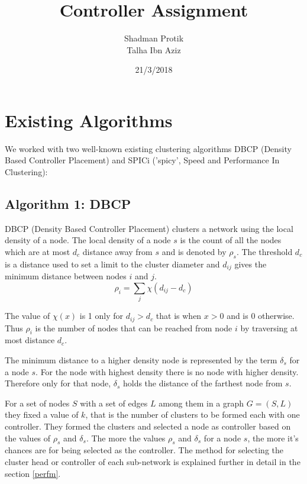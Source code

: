 \documentclass[8pt]{extarticle}
\begin{document}
	
	\twocolumn
	
	\title{Controller Assignment}
	\author{Shadman Protik\\Talha Ibn Aziz }
	\date{21/3/2018}
	\maketitle
	
	\section{Existing Algorithms}
	
	We worked with two well-known existing clustering algorithms DBCP (Density Based Controller Placement) and SPICi ('spicy', Speed and Performance In Clustering):
	
	\subsection{Algorithm 1: DBCP}

	DBCP (Density Based Controller Placement) clusters a network using the local density of a node. The local density of a node $s$ is the count of all the nodes which are at most $d_c$ distance away from $s$ and is denoted by $\rho_s$. The threshold $d_c$ is a distance used to set a limit to the cluster diameter and $d_{ij}$ gives the minimum distance between nodes $i$ and $j$.
	\begin{equation}
	\rho_i=\sum_j\chi(d_{ij}-d_c)
	\end{equation}
	
	The value of $\chi(x)$ is 1 only for $d_{ij}>d_c$ that is when $x>0$ and is 0 otherwise. Thus $\rho_i$ is the number of nodes that can be reached from node $i$ by traversing at most distance $d_c$.
	
	The minimum distance to a higher density node is represented by the term $\delta_s$ for a node $s$. For the node with highest density there is no node with higher density. Therefore only for that node, $\delta_s$ holds the distance of the farthest node from $s$.
	
	For a set of nodes $S$ with a set of edges $L$ among them in a graph $G=(S,L)$ they fixed a value of $k$, that is the number of clusters to be formed each with one controller. They formed the clusters and selected a node as controller based on the values of $\rho_s$ and $\delta_s$. The more the values $\rho_s$ and $\delta_s$ for a node $s$, the more it's chances are for being selected as the controller. The method for selecting the cluster head or controller of each sub-network is explained further in detail in the section \ref{perfm}.
	
\end{document}
